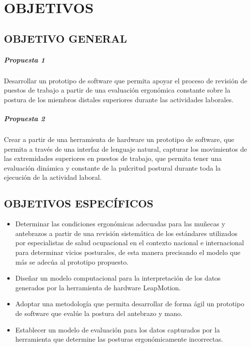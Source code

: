 \chapter{OBJETIVOS}
\section{OBJETIVO GENERAL}
\paragraph{Propuesta 1}
Desarrollar un prototipo de software que permita apoyar el proceso de revisión de puestos de trabajo a partir de una evaluación ergonómica constante sobre la postura de los miembros distales superiores durante las actividades laborales.
\paragraph{Propuesta 2}
Crear a partir de una herramienta de hardware un prototipo de software, que permita a través de una interfaz de lenguaje natural, capturar los movimientos de las extremidades superiores en puestos de trabajo, que permita tener una evaluación dinámica y  constante de la pulcritud postural durante toda la ejecución de la actividad laboral. 
\section{OBJETIVOS ESPECÍFICOS}
\begin{itemize}
    \item Determinar las condiciones ergonómicas adecuadas para las muñecas y antebrazos a partir de una revisión sistemática de los estándares utilizados por especialistas de salud ocupacional en el contexto nacional e internacional para determinar vicios posturales, de esta manera precisando el modelo que más se adecúa al prototipo propuesto.
    \item Diseñar un modelo computacional para la interpretación de los datos generados por la herramienta de hardware LeapMotion.
    \item Adoptar una metodología que permita desarrollar de forma ágil un prototipo de software que evalúe la postura del antebrazo y mano. %
    \item Establecer un modelo de evaluación para los datos capturados por la herramienta que determine las posturas ergonómicamente incorrectas. 
\end{itemize}